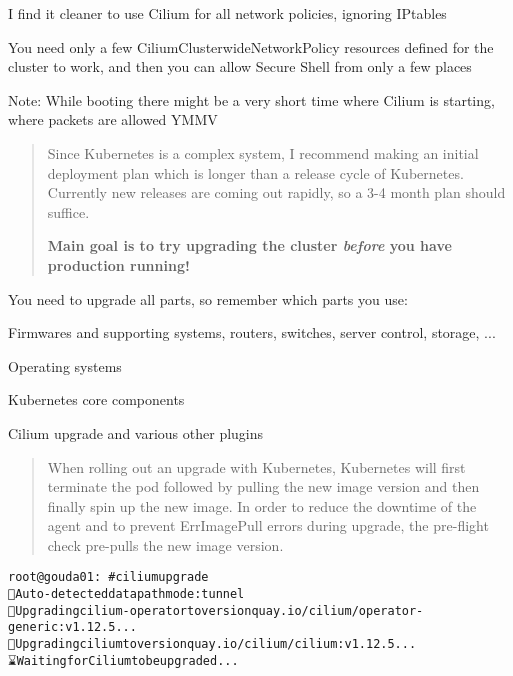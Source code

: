 \documentclass[Screen16to9,17pt]{foils}
\begin{document}
\begin{list2}
\item I find it cleaner to use Cilium for all network policies, ignoring IPtables
\item You need only a few CiliumClusterwideNetworkPolicy resources defined for the cluster to work, and then you can allow Secure Shell from only a few places
\item Note: While booting there might be a very short time where Cilium is starting, where packets are allowed YMMV
\end{list2}





\begin{quote}
Since Kubernetes is a complex system, I recommend making an initial deployment plan which is longer than a release cycle of Kubernetes. Currently new releases are coming out rapidly, so a 3-4 month plan should suffice.

{\bf Main goal is to try upgrading the cluster \emph{before} you have production running!}
\end{quote}


You need to upgrade all parts, so remember which parts you use:
\begin{list2}
\item Firmwares and supporting systems, routers, switches, server control, storage, ...
\item Operating systems
\item Kubernetes core components
\item Cilium upgrade and various other plugins
\end{list2}



\begin{quote}
When rolling out an upgrade with Kubernetes, Kubernetes will first terminate the pod followed by pulling the new image version and then finally spin up the new image. In order to reduce the downtime of the agent and to prevent ErrImagePull errors during upgrade, the pre-flight check pre-pulls the new image version.
\end{quote}

\begin{alltt}\footnotesize
root@gouda01:~# cilium upgrade
🔮 Auto-detected datapath mode: tunnel
🚀 Upgrading cilium-operator to version quay.io/cilium/operator-generic:v1.12.5...
🚀 Upgrading cilium to version quay.io/cilium/cilium:v1.12.5...
⌛ Waiting for Cilium to be upgraded...

\end{alltt}
\end{document}
